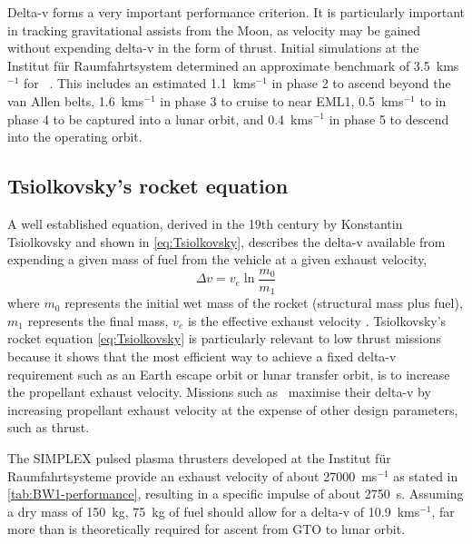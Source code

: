 Delta-v forms a very important performance criterion. It is particularly important in tracking gravitational assists from the Moon, as velocity may be gained without expending delta-v in the form of thrust. Initial simulations at the Institut f\"{u}r Raumfahrtsystem determined an approximate benchmark of 3.5~kms$^{-1}$ for \BW\ \parencite{Roeser2006}. This includes an estimated 1.1~kms$^{-1}$ in phase 2 to ascend beyond the van Allen belts, 1.6~kms$^{-1}$ in phase 3 to cruise to near EML1, 0.5~kms$^{-1}$ to in phase 4 to be captured into a lunar orbit, and 0.4~kms$^{-1}$ in phase 5 to descend into the operating orbit.

\subsection{Tsiolkovsky's rocket equation} \label{sec:Tsiolkovsky}

A well established equation, derived in the 19th century by Konstantin Tsiolkovsky and shown in \eqref{eq:Tsiolkovsky}, describes the delta-v available from expending a given mass of fuel from the vehicle at a given exhaust velocity,
\begin{equation}\label{eq:Tsiolkovsky}
\Delta v=v_{e}\ln\frac{m_{0}}{m_{1}}
\end{equation}
where $m_{0}$ represents the initial wet mass of the rocket (structural mass plus fuel), $m_{1}$ represents the final mass, $v_{e}$ is the effective exhaust velocity \parencite{Tsiolkovsky1903,Chobotov2002}. Tsiolkovsky's rocket equation \eqref{eq:Tsiolkovsky} is particularly relevant to low thrust missions because it shows that the most efficient way to achieve a fixed delta-v requirement such as an Earth escape orbit or lunar transfer orbit, is to increase the propellant exhaust velocity. Missions such as \BW\ maximise their delta-v by increasing propellant exhaust velocity at the expense of other design parameters, such as thrust.

The SIMPLEX pulsed plasma thrusters developed at the Institut f\"{u}r Raumfahrtsysteme \parencite{Nawaz2008} provide an exhaust velocity of about 27000~ms$^{-1}$ as stated in \autoref{tab:BW1-performance}, resulting in a specific impulse of about 2750~s. Assuming a dry mass of 150~kg, 75~kg of fuel should allow for a delta-v of 10.9~kms$^{-1}$, far more than is theoretically required for ascent from GTO to lunar orbit.




